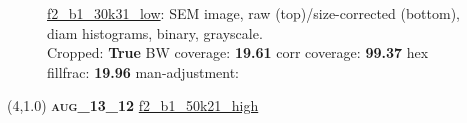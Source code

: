 \begin{figure}[h!]
\label{semimg24}
\caption*{\hyperlink{covtableaug_13_12}{\color{blue} \small \ttfamily f2\_b1\_30k31\_low}: SEM image, raw (top)/size-corrected (bottom), diam histograms, binary, grayscale.\\Cropped: {\bf True} \;\; BW coverage: {\bf 19.61} \:\: corr coverage: {\bf 99.37} \:\: hex fillfrac: {\bf 19.96} \:\: man-adjustment: {\bf \color{blue}{Yes}}}
\end{figure}
\newpage

\begin{textblock}{5}(4,1.0)
{\bf \textsc{aug\_13\_12}}
\hspace{4.5cm}
\hyperlink{covtableaug_13_12}{\color{blue} \large \ttfamily f2\_b1\_50k21\_high}
\end{textblock}

